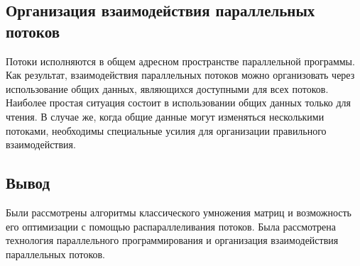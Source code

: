 \documentclass[a4paper, 12pt]{article}
\begin{document}
\begin{flushleft}
	\subsection{Организация взаимодействия параллельных потоков}
	\hspace*{5mm} Потоки исполняются в общем адресном пространстве параллельной программы. Как результат, взаимодействия параллельных потоков можно организовать через использование общих данных, являющихся доступными для всех потоков. Наиболее простая ситуация состоит в использовании общих данных только для чтения.
	\clearpage
	\newpage
	В случае же, когда общие данные могут изменяться несколькими потоками, необходимы специальные усилия для организации правильного взаимодействия.
	\subsection{Вывод}
	\hspace*{5mm} Были рассмотрены алгоритмы классического умножения матриц и возможность его оптимизации с помощью распараллеливания потоков. Была рассмотрена технология параллельного программирования и организация взаимодействия параллельных потоков.
\end{flushleft}

\newpage
\end{document}
